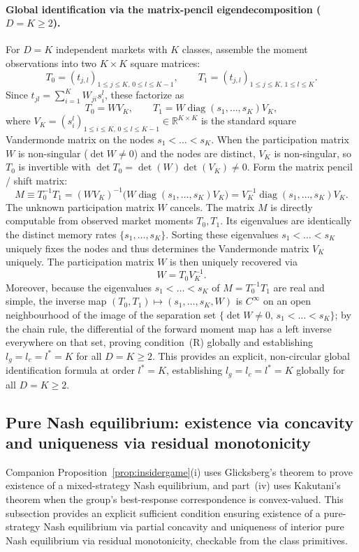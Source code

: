 \documentclass[12pt]{article}
\theoremstyle{definition}
\theoremstyle{remark}
\begin{document}
\paragraph{Global identification via the matrix-pencil eigendecomposition ($D=K\ge2$).} For $D=K$ independent markets with $K$ classes, assemble the moment observations into two $K\times K$ square matrices:
\[
T_0 = (t_{j,l})_{1\le j\le K,\,0\le l\le K-1},\qquad T_1 = (t_{j,l})_{1\le j\le K,\,1\le l\le K}.
\]
Since $t_{jl}=\sum_{i=1}^K W_{ji}s_i^l$, these factorize as
\[
T_0 = W V_K,\qquad T_1 = W \operatorname{diag}(s_1,\dots,s_K) V_K,
\]
where $V_K=(s_i^l)_{1\le i\le K,\,0\le l\le K-1}\in\mathbb{R}^{K\times K}$ is the standard square Vandermonde matrix on the nodes $s_1<\dots<s_K$. When the participation matrix $W$ is non-singular ($\det W\ne0$) and the nodes are distinct, $V_K$ is non-singular, so $T_0$ is invertible with $\det T_0 = \det(W)\det(V_K)\ne0$. Form the matrix pencil / shift matrix:
\[
M \equiv T_0^{-1}T_1 = (W V_K)^{-1}\bigl(W \operatorname{diag}(s_1,\dots,s_K) V_K\bigr) = V_K^{-1}\operatorname{diag}(s_1,\dots,s_K) V_K.
\]
The unknown participation matrix $W$ cancels. The matrix $M$ is directly computable from observed market moments $T_0, T_1$. Its eigenvalues are identically the distinct memory rates $\{s_1,\dots,s_K\}$. Sorting these eigenvalues $s_1<\dots<s_K$ uniquely fixes the nodes and thus determines the Vandermonde matrix $V_K$ uniquely. The participation matrix $W$ is then uniquely recovered via
\[
W = T_0 V_K^{-1}.
\]
Moreover, because the eigenvalues $s_1 < \dots < s_K$ of $M = T_0^{-1}T_1$ are real and simple, the inverse map $(T_0, T_1) \mapsto (s_1,\dots,s_K, W)$ is $C^\infty$ on an open neighbourhood of the image of the separation set $\{\det W \ne 0,\, s_1 < \dots < s_K\}$; by the chain rule, the differential of the forward moment map has a left inverse everywhere on that set, proving condition~(R) globally and establishing $l_g = l_c = l^* = K$ for all $D = K \ge 2$.
This provides an explicit, non-circular global identification formula at order $l^*=K$, establishing $l_g=l_c=l^*=K$ globally for all $D=K\ge2$.

\subsection{Pure Nash equilibrium: existence via concavity and uniqueness via residual monotonicity}\label{app:nashtight}

Companion Proposition~\ref{prop:insidergame}(i) uses Glicksberg's theorem to prove existence of a mixed-strategy Nash equilibrium, and part~(iv) uses Kakutani's theorem when the group's best-response correspondence is convex-valued. This subsection provides an explicit sufficient condition ensuring existence of a pure-strategy Nash equilibrium via partial concavity and uniqueness of interior pure Nash equilibrium via residual monotonicity, checkable from the class primitives.
\end{document}
